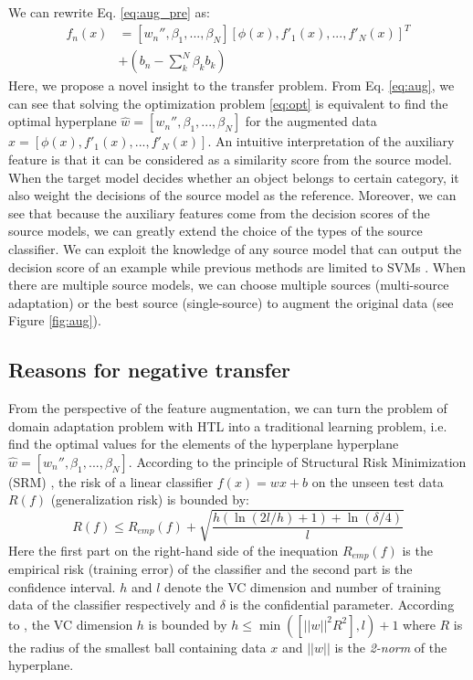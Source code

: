 We can rewrite Eq. \eqref{eq:aug_pre} as:
\begin{equation}\label{eq:aug}
\begin{aligned}
f_n(x)&= [w_{n}'',\beta_1,...,\beta_N][\phi(x),f'_1(x),...,f'_N(x)]^T\\&+(b_n-\sum\limits_k^N{\beta _kb_k})
\end{aligned}
\end{equation}
Here, we propose a novel insight to the transfer problem. From Eq. \eqref{eq:aug}, we can see that solving the optimization problem \eqref{eq:opt} is equivalent to find the optimal hyperplane $\hat{w}=[w_{n}'',\beta_1,...,\beta_N]$ for the augmented data $\hat{x}=[\phi(x),f'_1(x),...,f'_N(x)]$. An intuitive interpretation of the auxiliary feature is that it can be considered as a similarity score from the source model. When the target model decides whether an object belongs to certain category, it also weight the decisions of the source model as the reference.
Moreover, we can see that because the auxiliary features come from the decision scores of the source models, we can greatly extend the choice of the types of the source classifier. We can exploit the knowledge of any source model that can output the decision score of an example while previous methods are limited to SVMs \cite{tommasi2014learning} \cite{kuzborskij2013n}. When there are multiple source models, we can choose multiple sources (multi-source adaptation) or the best source (single-source) to augment the original data (see Figure \ref{fig:aug}).



\subsection{Reasons for negative transfer}
From the perspective of the feature augmentation, we can turn the problem of domain adaptation problem with HTL into a traditional learning problem, i.e. find the optimal values for the elements of the hyperplane hyperplane $\hat{w}=[w_{n}'',\beta_1,...,\beta_N]$. According to the principle of Structural Risk Minimization (SRM) \cite{vapnik1999overview}, the risk of a linear classifier $f(x)=wx+b$ on the unseen test data $R(f)$ (generalization risk) is bounded by:
\begin{equation}\label{eq:srm}
R(f) \le {R_{emp}}(f) + \sqrt {\frac{{h(\ln (2l/h) + 1) + \ln (\delta /4)}}{l}} 
\end{equation}
Here the first part on the right-hand side of the inequation ${R_{emp}}(f)$ is the empirical risk (training error) of the classifier and the second part is the confidence interval. $h$ and $l$ denote the VC dimension and number of training data of the classifier respectively and $\delta$ is the confidential parameter. According to \cite{suykens1999least}, the VC dimension $h$ is bounded by $h \le \min([||w||^2R^2],l)+1$ where $R$ is the radius of the smallest ball containing data $x$ and $||w||$ is the \textit{2-norm} of the hyperplane.

